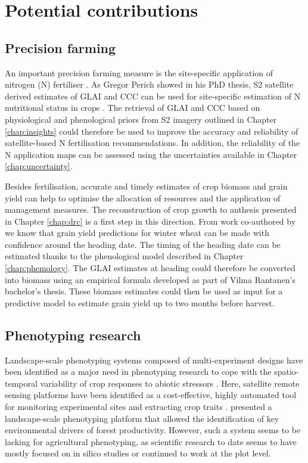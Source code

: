 \section{Potential contributions}

\subsection{Precision farming}
An important precision farming measure is the site-specific application of nitrogen (N) fertiliser \citep{argento_site-specific_2021}. As Gregor Perich showed in his PhD thesis, \gls{S2} satellite derived estimates of \gls{GLAI} and \gls{CCC} can be used for site-specific estimation of N nutritional status in crops \citep{perich_satellite-based_2023}. The retrieval of \gls{GLAI} and \gls{CCC} based on physiological and phenological priors from \gls{S2} imagery outlined in Chapter \ref{chap:insights} could therefore be used to improve the accuracy and reliability of satellite-based N fertilisation recommendations. In addition, the reliability of the N application maps can be assessed using the uncertainties available in Chapter \ref{chap:uncertainty}.

Besides fertilisation, accurate and timely estimates of crop biomass and grain yield can help to optimise the allocation of resources and the application of management measures. The reconstruction of crop growth to anthesis presented in Chapter \ref{chap:drc} is a first step in this direction. From work co-authored by \cite{amin_-season_2024} we know that grain yield predictions for winter wheat can be made with confidence around the heading date. The timing of the heading date can be estimated thanks to the phenological model described in Chapter \ref{chap:phemology}. The \gls{GLAI} estimates at heading could therefore be converted into biomass using an empirical formula developed as part of Vilma Rantanen's bachelor's thesis. These biomass estimates could then be used as input for a predictive model to estimate grain yield up to two months before harvest.

\subsection{Phenotyping research}
Landscape-scale phenotyping systems composed of multi-experiment designs have been identified as a major need in phenotyping research to cope with the spatio-temporal variability of crop responses to abiotic stressors \citep{smith_scaling_2021}. Here, satellite remote sensing platforms have been identified as a cost-effective, highly automated tool for monitoring experimental sites and extracting crop traits \citep{zhang_high-resolution_2020, pinto_satellite_2023}. \citep{dungey_phenotyping_2018} presented a landscape-scale phenotyping platform that allowed the identification of key environmental drivers of forest productivity. However, such a system seems to be lacking for agricultural phenotyping, as scientific research to date seems to have mostly focused on in silico studies \citep[for example]{waldner_high_2019} or continued to work at the plot level.

